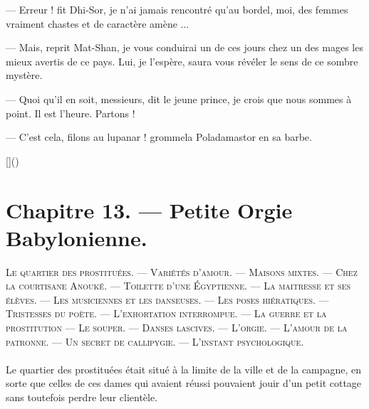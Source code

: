 \documentclass[a4paper, 11pt, oneside, polutonikogreek, french]{article}
\begin{document}
--- Erreur ! fit Dhi-Sor, je n'ai jamais rencontré qu'au bordel, moi, des femmes vraiment chastes et de caractère amène ...

--- Mais, reprit Mat-Shan, je vous conduirai un de ces jours chez un des mages les mieux avertis de ce pays. Lui, je l'espère, saura vous révéler le sens de ce sombre mystère.

--- Quoi qu'il en soit, messieurs, dit le jeune prince, je crois que nous sommes à point. Il est l'heure. Partons !

--- C'est cela, filons au lupanar ! grommela Poladamastor en sa barbe.

[]()
\clearpage
\section{Chapitre 13. --- Petite Orgie Babylonienne.}
\begin{center}
\scshape
\small
Le quartier des prostituées. --- Variétés d'amour. --- Maisons mixtes. --- Chez la courtisane Anouké. --- Toilette d'une Égyptienne. --- La maitresse et ses élèves. --- Les musiciennes et les danseuses. --- Les poses hiératiques. --- Tristesses du poète. --- L'exhortation interrompue. --- La guerre et la prostitution --- Le souper. --- Danses lascives. --- L'orgie. --- L'amour de la patronne. --- Un secret de callipygie. --- L'instant psychologique.
\end{center}
\paragraph{}
Le quartier des prostituées était situé à la limite de la ville et de la campagne, en sorte que celles de ces dames qui avaient réussi pouvaient jouir d'un petit cottage sans toutefois perdre leur clientèle.
\end{document}
